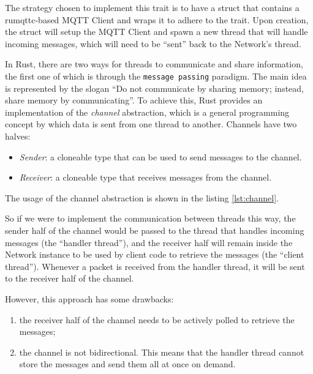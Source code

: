 

The strategy chosen to implement this trait is to have a struct that contains a rumqttc-based MQTT Client and wraps it to adhere to the trait. Upon creation, the struct will
setup the MQTT Client and spawn a new thread that will handle incoming messages, which will need to be ``sent'' back to the Network's thread.

In Rust, there are two ways for threads to communicate and share information, the first one of which is through the \texttt{message passing} paradigm. The main idea is represented by
the slogan ``Do not communicate by sharing memory; instead, share memory by communicating''. To achieve this, Rust provides an implementation of the \textit{channel} abstraction,
which is a general programming concept by which data is sent from one thread to another. Channels have two halves:

\begin{itemize}
    \item \textit{Sender}: a cloneable type that can be used to send messages to the channel.
    \item \textit{Receiver}: a cloneable type that receives messages from the channel.
\end{itemize}

The usage of the channel abstraction is shown in the listing \ref{lst:channel}.



So if we were to implement the communication between threads this way, the sender half of the channel would be passed to the thread that handles incoming messages (the ``handler thread''), and the receiver half will
remain inside the Network instance to be used by client code to retrieve the messages (the ``client thread''). Whenever a packet is received from the handler thread, it will be sent to the receiver half of the channel.

However, this approach has some drawbacks:

\begin{enumerate}
    \item the receiver half of the channel needs to be actively polled to retrieve the messages;
    \item the channel is not bidirectional. This means that the handler thread cannot store the messages and send them all at once on demand.
\end{enumerate}

